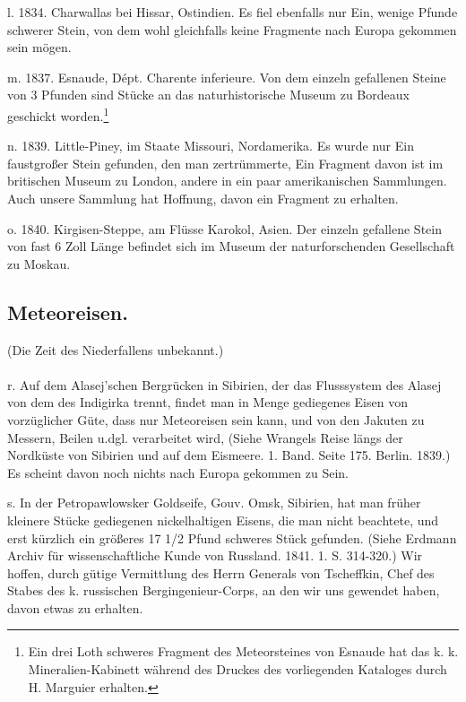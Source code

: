 \documentclass[a4paper, 11pt, oneside, polutonikogreek, german]{article}
\begin{document}
l. 1834. Charwallas bei Hissar, Ostindien. Es fiel ebenfalls nur Ein, wenige Pfunde schwerer Stein, von dem wohl gleichfalls keine Fragmente nach Europa gekommen sein mögen.

m. 1837. Esnaude, Dépt. Charente inferieure. Von dem einzeln gefallenen Steine von 3 Pfunden sind Stücke an das naturhistorische Museum zu Bordeaux geschickt worden.\footnote{Ein drei Loth schweres Fragment des Meteorsteines von Esnaude hat das k. k. Mineralien-Kabinett während des Druckes des vorliegenden Kataloges durch H. Marguier erhalten.}

n. 1839. Little-Piney, im Staate Missouri, Nordamerika. Es wurde nur Ein faustgroßer Stein gefunden, den man zertrümmerte, Ein Fragment davon ist im britischen Museum zu London, andere in ein paar amerikanischen Sammlungen. Auch unsere Sammlung hat Hoffnung, davon ein Fragment zu erhalten.

o. 1840. Kirgisen-Steppe, am Flüsse Karokol, Asien. Der einzeln gefallene Stein von fast 6 Zoll Länge befindet sich im Museum der naturforschenden Gesellschaft zu Moskau.
\subsection{Meteoreisen.}
\begin{center}
(Die Zeit des Niederfallens unbekannt.)
\end{center}
\paragraph{}
r. Auf dem Alasej'schen Bergrücken in Sibirien, der das Flusssystem des Alasej von dem des Indigirka trennt, findet man in Menge gediegenes Eisen von vorzüglicher Güte, dass nur Meteoreisen sein kann, und von den Jakuten zu Messern, Beilen u.dgl. verarbeitet wird, (Siehe Wrangels Reise längs der Nordküste von Sibirien und auf dem Eismeere. 1. Band. Seite 175. Berlin. 1839.) Es scheint davon noch nichts nach Europa gekommen zu Sein.

s. In der Petropawlowsker Goldseife, Gouv. Omsk, Sibirien, hat man früher kleinere Stücke gediegenen nickelhaltigen Eisens, die man nicht beachtete, und erst kürzlich ein größeres 17 1/2 Pfund schweres Stück gefunden. (Siehe Erdmann Archiv für wissenschaftliche Kunde von Russland. 1841. 1. S. 314-320.) Wir hoffen, durch gütige Vermittlung des Herrn Generals von Tscheffkin, Chef des Stabes des k. russischen Bergingenieur-Corps, an den wir uns gewendet haben, davon etwas zu erhalten.
\end{document}
